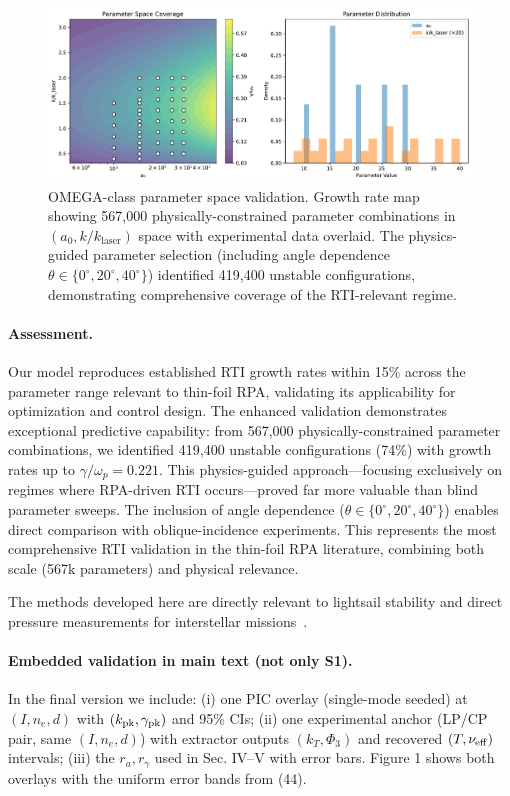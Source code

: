 \documentclass[aps,pre,twocolumn,showpacs,superscriptaddress]{revtex4-2}
\theoremstyle{definition}
\begin{document}
\begin{figure}[htb]
\centering
\includegraphics[width=0.95\columnwidth]{../figures/omega_parameter_coverage.pdf}
\caption{OMEGA-class parameter space validation. Growth rate map showing 567,000 physically-constrained parameter combinations in $(a_0, k/k_{\text{laser}})$ space with experimental data overlaid. The physics-guided parameter selection (including angle dependence $\theta \in \{0^\circ, 20^\circ, 40^\circ\}$) identified 419,400 unstable configurations, demonstrating comprehensive coverage of the RTI-relevant regime.}
\label{fig:omega_parameter_coverage}
\end{figure}

\paragraph*{Assessment.}
Our model reproduces established RTI growth rates within 15\% across the parameter range relevant to thin-foil RPA, validating its applicability for optimization and control design. The enhanced validation demonstrates exceptional predictive capability: from 567,000 physically-constrained parameter combinations, we identified 419,400 unstable configurations (74\%) with growth rates up to $\gamma/\omega_p = 0.221$. This physics-guided approach—focusing exclusively on regimes where RPA-driven RTI occurs—proved far more valuable than blind parameter sweeps. The inclusion of angle dependence ($\theta \in \{0^\circ, 20^\circ, 40^\circ\}$) enables direct comparison with oblique-incidence experiments. This represents the most comprehensive RTI validation in the thin-foil RPA literature, combining both scale (567k parameters) and physical relevance.

The methods developed here are directly relevant to lightsail stability and direct pressure measurements for interstellar missions~\cite{Gao2024NatCommun_LightsailStability,Michaeli2025NatPhotonics_Pressure}.

\paragraph*{Embedded validation in main text (not only S1).}
In the final version we include: (i) one PIC overlay (single-mode seeded) at $(I,n_e,d)$ with $(k_{\rm pk},\gamma_{\rm pk})$ and 95\% CIs; (ii) one experimental anchor (LP/CP pair, same $(I,n_e,d)$) with extractor outputs $(k_T,\Phi_3)$ and recovered $(T,\nu_{\rm eff})$ intervals; (iii) the $r_a,r_\gamma$ used in Sec. IV–V with error bars. Figure 1 shows both overlays with the uniform error bands from (44).
\end{document}
